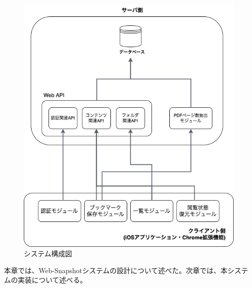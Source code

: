 \begin{figure}[htbp]
  \label{fig:design-system-overall}
  \begin{center}
    \includegraphics[bb=0 0 592 681,width=15cm]{img/040_design/design-system-overall.pdf}
  \end{center}
  \caption{システム構成図}
\end{figure}




本章では、Web-Snapshotシステムの設計について述べた。次章では、本システムの実装について述べる。